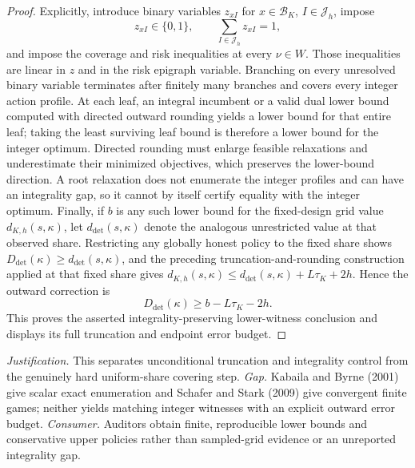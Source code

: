 \documentclass{article}
\begin{document}
\begin{proof}
Explicitly, introduce binary variables \(z_{xI}\) for \(x\in\mathcal B_K\), \(I\in\mathcal J_h\), impose
\[
 z_{xI}\in\{0,1\},
 \qquad
 \sum_{I\in\mathcal J_h}z_{xI}=1,
\]
and impose the coverage and risk inequalities at every \(\nu\in W\).  Those inequalities are linear in \(z\) and in the risk epigraph variable.  Branching on every unresolved binary variable terminates after finitely many branches and covers every integer action profile.  At each leaf, an integral incumbent or a valid dual lower bound computed with directed outward rounding yields a lower bound for that entire leaf; taking the least surviving leaf bound is therefore a lower bound for the integer optimum.  Directed rounding must enlarge feasible relaxations and underestimate their minimized objectives, which preserves the lower-bound direction.  A root relaxation does not enumerate the integer profiles and can have an integrality gap, so it cannot by itself certify equality with the integer optimum.  Finally, if \(b\) is any such lower bound for the fixed-design grid value \(d_{K,h}(s,\kappa)\), let \(d_{\mathrm{det}}(s,\kappa)\) denote the analogous unrestricted value at that observed share.  Restricting any globally honest policy to the fixed share shows \(D_{\mathrm{det}}(\kappa)\ge d_{\mathrm{det}}(s,\kappa)\), and the preceding truncation-and-rounding construction applied at that fixed share gives \(d_{K,h}(s,\kappa)\le d_{\mathrm{det}}(s,\kappa)+L\tau_K+2h\).  Hence the outward correction is
\[
 D_{\mathrm{det}}(\kappa)\ge b-L\tau_K-2h.
\]
This proves the asserted integrality-preserving lower-witness conclusion and displays its full truncation and endpoint error budget.
\end{proof}
\par\smallskip\noindent \textit{Justification.} This separates unconditional truncation and integrality control from the genuinely hard uniform-share covering step. \textit{Gap.} Kabaila and Byrne (2001) give scalar exact enumeration and Schafer and Stark (2009) give convergent finite games; neither yields matching integer witnesses with an explicit outward error budget. \textit{Consumer.} Auditors obtain finite, reproducible lower bounds and conservative upper policies rather than sampled-grid evidence or an unreported integrality gap.
\end{document}
